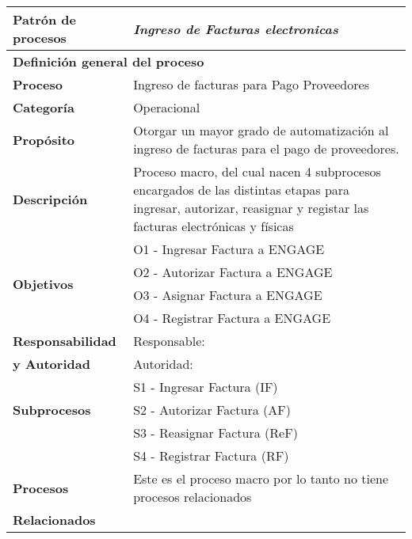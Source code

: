 \begin{longtable}{|llrrrrrr|}
	\hline
	\multicolumn{2}{|l|}{\textbf{Patrón de procesos}} & \multicolumn{6}{|l|}{\textit{Ingreso de Facturas electronicas}} \\ \hline
	\multicolumn{8}{|l|}{\textbf{Definición general del proceso}} \\ \hline
	\textbf{Proceso} & \multicolumn{7}{|m{12cm}|}{Ingreso de facturas para Pago Proveedores} \\ \hline
	\textbf{Categoría} & \multicolumn{7}{|m{12cm}|}{Operacional} \\ \hline
	\textbf{Propósito} & \multicolumn{7}{|m{12cm}|}{Otorgar un mayor grado de automatización al ingreso de facturas para el pago de proveedores.} \\ \hline
    \textbf{Descripción} & \multicolumn{7}{|m{12cm}|}{Proceso macro, del cual nacen 4 subprocesos encargados de las distintas etapas para ingresar, autorizar, reasignar y registar las facturas electrónicas y físicas} \\ \hline
	\multirow{4}[6]{*}{\textbf{Objetivos}} 
		  & \multicolumn{7}{|l|}{O1 - Ingresar Factura a ENGAGE} \\ \cline{2-8}
          & \multicolumn{7}{|l|}{O2 - Autorizar Factura a ENGAGE} \\ \cline{2-8}
          & \multicolumn{7}{|l|}{O3 - Asignar Factura a ENGAGE} \\ \hline
          & \multicolumn{7}{|l|}{O4 - Registrar Factura a ENGAGE} \\ \hline
    \multicolumn{1}{|l|}{\textbf{Responsabilidad}} 	& \multicolumn{7}{|l|}{Responsable: } \\
	\multicolumn{1}{|l|}{\textbf{y Autoridad}} 	& \multicolumn{7}{|l|}{Autoridad: } \\ \hline
	\multirow{3}[4]{*}{\textbf{Subprocesos}} 
		  & \multicolumn{7}{|l|}{S1 - Ingresar Factura (IF)} \\  \cline{2-8} 
	      & \multicolumn{7}{|l|}{S2 - Autorizar Factura (AF)} \\  \cline{2-8} 
	      & \multicolumn{7}{|l|}{S3 - Reasignar Factura (ReF)} \\ \cline{2-8}
	      & \multicolumn{7}{|l|}{S4 - Registrar Factura (RF)} \\ \hline
    \multicolumn{1}{|l|}{\textbf{Procesos}} 	& \multicolumn{7}{|l|}{Este es el proceso macro por lo tanto no tiene procesos relacionados} \\
	\multicolumn{1}{|l|}{\textbf{Relacionados}} 	&  \multicolumn{7}{|l|}{} \\ \hline

\end{longtable}
